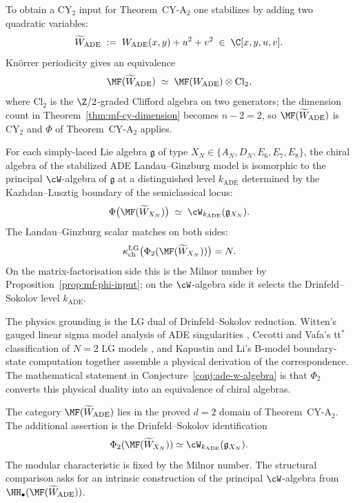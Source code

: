 To obtain a CY$_2$ input for Theorem~CY-A$_2$ one stabilizes by adding two quadratic variables:
\[
 \widetilde{W}_{\mathrm{ADE}} \;:=\; W_{\mathrm{ADE}}(x, y) + u^2 + v^2 \;\in\; \C[x, y, u, v] .
\]
Kn\"orrer periodicity \cite{Knorrer1987} gives an equivalence
\[
 \MF(\widetilde{W}_{\mathrm{ADE}}) \;\simeq\; \MF(W_{\mathrm{ADE}}) \otimes \mathrm{Cl}_2 ,
\]
where $\mathrm{Cl}_2$ is the $\Z/2$-graded Clifford algebra on two generators; the dimension count in Theorem~\ref{thm:mf-cy-dimension} becomes $n - 2 = 2$, so $\MF(\widetilde{W}_{\mathrm{ADE}})$ is CY$_2$ and $\Phi$ of Theorem~CY-A$_2$ applies.

\begin{conjecture}
\label{conj:ade-w-algebra}
\ClaimStatusConjectured
For each simply-laced Lie algebra $\mathfrak{g}$ of type $X_N \in \{A_N, D_N, E_6, E_7, E_8\}$, the chiral algebra of the stabilized ADE Landau--Ginzburg model is isomorphic to the principal $\cW$-algebra of $\mathfrak{g}$ at a distinguished level $k_{\mathrm{ADE}}$ determined by the Kazhdan--Lusztig boundary of the semiclassical locus:
\[
 \Phi\bigl(\MF(\widetilde{W}_{X_N})\bigr) \;\simeq\; \cW_{k_{\mathrm{ADE}}}(\mathfrak{g}_{X_N}) .
\]
The Landau--Ginzburg scalar matches on both sides:
\[
\kappa_{\mathrm{ch}}^{\mathrm{LG}}\bigl(\Phi_2(\MF(\widetilde{W}_{X_N}))\bigr)=N .
\]
On the matrix-factorisation side this is the Milnor number by Proposition~\ref{prop:mf-phi-input}; on the $\cW$-algebra side it selects the Drinfeld--Sokolov level $k_{\mathrm{ADE}}$.
\end{conjecture}

The physics grounding is the LG dual of Drinfeld--Sokolov reduction. Witten's gauged linear sigma model analysis of ADE singularities \cite{Witten1993}, Cecotti and Vafa's tt$^*$ classification of $N = 2$ LG models \cite{CecottiVafa1993}, and Kapustin and Li's B-model boundary-state computation \cite{KapustinLi2003} together assemble a physical derivation of the correspondence. The mathematical statement in Conjecture~\ref{conj:ade-w-algebra} is that $\Phi_2$ converts this physical duality into an equivalence of chiral algebras.

\begin{remark}
\label{rem:ade-conj-scope}
The category $\MF(\widetilde{W}_{\mathrm{ADE}})$ lies in the proved \(d=2\) domain of Theorem~CY-A$_2$. The additional assertion is the Drinfeld--Sokolov identification
\[
\Phi_2(\MF(\widetilde{W}_{X_N})) \simeq \cW_{k_{\mathrm{ADE}}}(\mathfrak g_{X_N}).
\]
The modular characteristic is fixed by the Milnor number. The structural comparison asks for an intrinsic construction of the principal $\cW$-algebra from $\HH_\bullet(\MF(\widetilde{W}_{\mathrm{ADE}}))$.
\end{remark}

